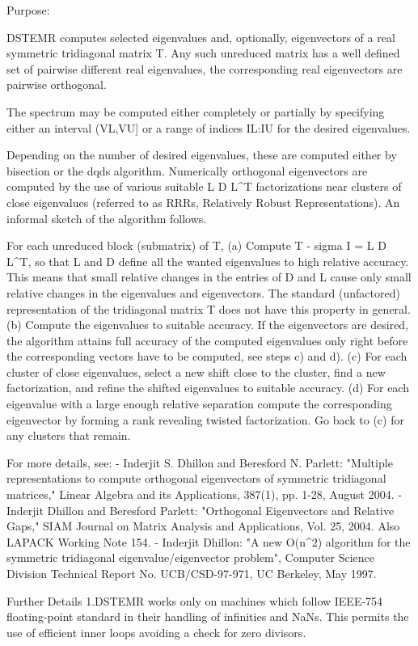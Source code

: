  \begin{DoxyParagraph}{Purpose\+: }
\begin{DoxyVerb} DSTEMR computes selected eigenvalues and, optionally, eigenvectors
 of a real symmetric tridiagonal matrix T. Any such unreduced matrix has
 a well defined set of pairwise different real eigenvalues, the corresponding
 real eigenvectors are pairwise orthogonal.

 The spectrum may be computed either completely or partially by specifying
 either an interval (VL,VU] or a range of indices IL:IU for the desired
 eigenvalues.

 Depending on the number of desired eigenvalues, these are computed either
 by bisection or the dqds algorithm. Numerically orthogonal eigenvectors are
 computed by the use of various suitable L D L^T factorizations near clusters
 of close eigenvalues (referred to as RRRs, Relatively Robust
 Representations). An informal sketch of the algorithm follows.

 For each unreduced block (submatrix) of T,
    (a) Compute T - sigma I  = L D L^T, so that L and D
        define all the wanted eigenvalues to high relative accuracy.
        This means that small relative changes in the entries of D and L
        cause only small relative changes in the eigenvalues and
        eigenvectors. The standard (unfactored) representation of the
        tridiagonal matrix T does not have this property in general.
    (b) Compute the eigenvalues to suitable accuracy.
        If the eigenvectors are desired, the algorithm attains full
        accuracy of the computed eigenvalues only right before
        the corresponding vectors have to be computed, see steps c) and d).
    (c) For each cluster of close eigenvalues, select a new
        shift close to the cluster, find a new factorization, and refine
        the shifted eigenvalues to suitable accuracy.
    (d) For each eigenvalue with a large enough relative separation compute
        the corresponding eigenvector by forming a rank revealing twisted
        factorization. Go back to (c) for any clusters that remain.

 For more details, see:
 - Inderjit S. Dhillon and Beresford N. Parlett: "Multiple representations
   to compute orthogonal eigenvectors of symmetric tridiagonal matrices,"
   Linear Algebra and its Applications, 387(1), pp. 1-28, August 2004.
 - Inderjit Dhillon and Beresford Parlett: "Orthogonal Eigenvectors and
   Relative Gaps," SIAM Journal on Matrix Analysis and Applications, Vol. 25,
   2004.  Also LAPACK Working Note 154.
 - Inderjit Dhillon: "A new O(n^2) algorithm for the symmetric
   tridiagonal eigenvalue/eigenvector problem",
   Computer Science Division Technical Report No. UCB/CSD-97-971,
   UC Berkeley, May 1997.

 Further Details
 1.DSTEMR works only on machines which follow IEEE-754
 floating-point standard in their handling of infinities and NaNs.
 This permits the use of efficient inner loops avoiding a check for
 zero divisors.\end{DoxyVerb}
 
\end{DoxyParagraph}

